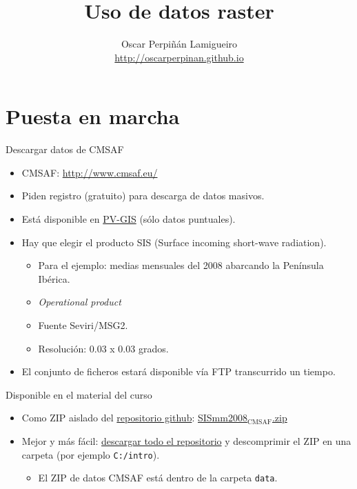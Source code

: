 \documentclass[xcolor={usenames,svgnames,dvipsnames}]{beamer}
\author{Oscar Perpiñán Lamigueiro \\ \url{http://oscarperpinan.github.io}}
\date{}
\title{Uso de datos raster}
\begin{document}
\maketitle


\section{Puesta en marcha}
\label{sec-1}

\begin{frame}[label=sec-1-1]{Descargar datos de CMSAF}
\begin{itemize}
\item CMSAF: \url{http://www.cmsaf.eu/}
\item Piden registro (gratuito) para descarga de datos masivos.
\item Está disponible en \href{http://re.jrc.ec.europa.eu/pvgis/apps4/pvest.php}{PV-GIS} (sólo datos puntuales).
\item Hay que elegir el producto SIS (Surface incoming short-wave radiation).
\begin{itemize}
\item Para el ejemplo: medias mensuales del 2008 abarcando la Península Ibérica.
\item \emph{Operational product}
\item Fuente Seviri/MSG2.
\item Resolución: 0.03 x 0.03 grados.
\end{itemize}
\item El conjunto de ficheros estará disponible vía FTP transcurrido un tiempo.
\end{itemize}
\end{frame}
\begin{frame}[fragile,label=sec-1-2]{Disponible en el material del curso}
 \begin{itemize}
\item Como ZIP aislado del \href{https://github.com/oscarperpinan/intro}{repositorio github}: \href{https://github.com/oscarperpinan/intro/blob/master/data/SISmm2008_CMSAF.zip}{SISmm2008$_{\text{CMSAF}}$.zip}
\item Mejor y más fácil: \href{https://github.com/oscarperpinan/intro/archive/master.zip}{descargar todo el repositorio} y descomprimir el ZIP en una carpeta (por ejemplo \texttt{C:/intro}).
\begin{itemize}
\item El ZIP de datos CMSAF está dentro de la carpeta \texttt{data}.
\end{itemize}
\end{itemize}
\end{frame}
\end{document}
